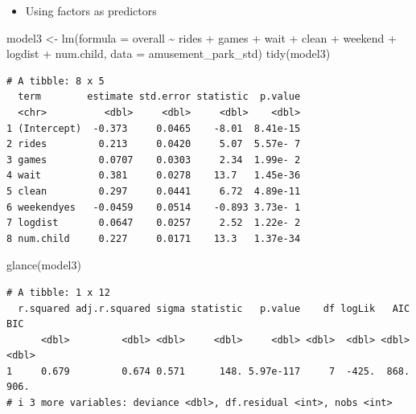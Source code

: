 \documentclass[
  ignorenonframetext,
]{beamer}
\newenvironment{Shaded}{\begin{snugshade}}{\end{snugshade}}
\newcommand{\AttributeTok}[1]{\textcolor[rgb]{0.40,0.45,0.13}{#1}}
\newcommand{\FunctionTok}[1]{\textcolor[rgb]{0.28,0.35,0.67}{#1}}
\newcommand{\NormalTok}[1]{\textcolor[rgb]{0.00,0.23,0.31}{#1}}
\newcommand{\OtherTok}[1]{\textcolor[rgb]{0.00,0.23,0.31}{#1}}
\newcommand{\SpecialCharTok}[1]{\textcolor[rgb]{0.37,0.37,0.37}{#1}}
\providecommand{\tightlist}{%
  \setlength{\itemsep}{0pt}\setlength{\parskip}{0pt}}\usepackage{longtable,booktabs,array}
\begin{document}
\begin{frame}[fragile]{}
\label{section-36}
\begin{itemize}
\tightlist
\item
  Using factors as predictors
\end{itemize}

\tiny

\begin{Shaded}
\begin{Highlighting}[]
\NormalTok{model3 }\OtherTok{\textless{}{-}} \FunctionTok{lm}\NormalTok{(}\AttributeTok{formula =}\NormalTok{ overall }\SpecialCharTok{\textasciitilde{}}\NormalTok{ rides }\SpecialCharTok{+}\NormalTok{ games }\SpecialCharTok{+}\NormalTok{ wait }\SpecialCharTok{+}\NormalTok{ clean }\SpecialCharTok{+}\NormalTok{ weekend }\SpecialCharTok{+}\NormalTok{ logdist }\SpecialCharTok{+}\NormalTok{ num.child,}
             \AttributeTok{data =}\NormalTok{ amusement\_park\_std)}
\FunctionTok{tidy}\NormalTok{(model3)}
\end{Highlighting}
\end{Shaded}

\begin{verbatim}
# A tibble: 8 x 5
  term        estimate std.error statistic  p.value
  <chr>          <dbl>     <dbl>     <dbl>    <dbl>
1 (Intercept)  -0.373     0.0465    -8.01  8.41e-15
2 rides         0.213     0.0420     5.07  5.57e- 7
3 games         0.0707    0.0303     2.34  1.99e- 2
4 wait          0.381     0.0278    13.7   1.45e-36
5 clean         0.297     0.0441     6.72  4.89e-11
6 weekendyes   -0.0459    0.0514    -0.893 3.73e- 1
7 logdist       0.0647    0.0257     2.52  1.22e- 2
8 num.child     0.227     0.0171    13.3   1.37e-34
\end{verbatim}

\begin{Shaded}
\begin{Highlighting}[]
\FunctionTok{glance}\NormalTok{(model3)}
\end{Highlighting}
\end{Shaded}

\begin{verbatim}
# A tibble: 1 x 12
  r.squared adj.r.squared sigma statistic   p.value    df logLik   AIC   BIC
      <dbl>         <dbl> <dbl>     <dbl>     <dbl> <dbl>  <dbl> <dbl> <dbl>
1     0.679         0.674 0.571      148. 5.97e-117     7  -425.  868.  906.
# i 3 more variables: deviance <dbl>, df.residual <int>, nobs <int>
\end{verbatim}
\end{frame}
\end{document}
